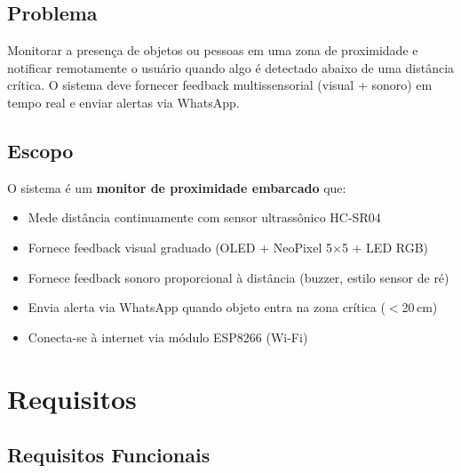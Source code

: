 \documentclass[12pt, a4paper]{article}
\begin{document}
\subsection{Problema}

Monitorar a presença de objetos ou pessoas em uma zona de proximidade e notificar remotamente o usuário quando algo é detectado abaixo de uma distância crítica. O sistema deve fornecer feedback multissensorial (visual + sonoro) em tempo real e enviar alertas via WhatsApp.

\subsection{Escopo}

O sistema é um \textbf{monitor de proximidade embarcado} que:

\begin{itemize}
  \item Mede distância continuamente com sensor ultrassônico HC-SR04
  \item Fornece feedback visual graduado (OLED + NeoPixel 5$\times$5 + LED RGB)
  \item Fornece feedback sonoro proporcional à distância (buzzer, estilo sensor de ré)
  \item Envia alerta via WhatsApp quando objeto entra na zona crítica ($<$20\,cm)
  \item Conecta-se à internet via módulo ESP8266 (Wi-Fi)
\end{itemize}


\section{Requisitos}
\label{sec:requisitos}

\subsection{Requisitos Funcionais}
\end{document}
